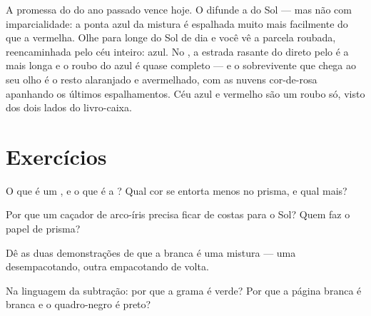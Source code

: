 \begin{remark}\label{rem:g8:colors-spectra:sunset}
A promessa do  do ano passado vence hoje. O  difunde a 
do Sol --- mas não com imparcialidade: a ponta azul da mistura é
espalhada muito mais facilmente do que a vermelha. Olhe para longe do
Sol de dia e você vê a parcela roubada, reencaminhada pelo céu
inteiro: azul. No , a estrada rasante do  direto pelo
 é a mais longa e o roubo do azul é quase completo --- e o
sobrevivente que chega ao seu olho é o resto alaranjado e avermelhado,
com as nuvens cor-de-rosa apanhando os últimos espalhamentos. Céu
azul e  vermelho são um roubo só, visto dos dois lados do
livro-caixa.
\end{remark}

\section{Exercícios}

\begin{exercise}[$\star$]\label{exo:g8:colors-spectra:1}
O que é um , e o que é a ? Qual cor se entorta menos
no prisma, e qual mais?
\end{exercise}

\begin{exercise}[$\star$]\label{exo:g8:colors-spectra:2}
Por que um caçador de arco-íris precisa ficar de costas para o Sol?
Quem faz o papel de prisma?
\end{exercise}

\begin{exercise}[$\star$]\label{exo:g8:colors-spectra:3}
Dê as duas demonstrações de que a  branca é uma mistura --- uma
desempacotando, outra empacotando de volta.
\end{exercise}

\begin{exercise}[$\star$]\label{exo:g8:colors-spectra:4}
Na linguagem da subtração: por que a grama é verde? Por que a página
branca é branca e o quadro-negro é preto?
\end{exercise}

